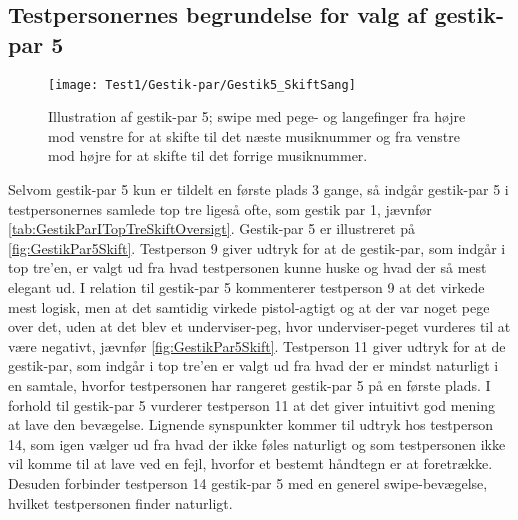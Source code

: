 \subsection{Testpersonernes begrundelse for valg af gestik-par 5}
\label{TestresultaterValgAfGestikkerBegrundelseGP5Skift}
%
%
\begin{figure}[H]
	\centering
	\texttt{[image: Test1/Gestik-par/Gestik5\_SkiftSang]}
	\caption{Illustration af gestik-par 5; swipe med pege- og langefinger fra højre mod venstre for at skifte til det næste musiknummer og fra venstre mod højre for at skifte til det forrige musiknummer.}
	\label{fig:GestikPar5Skift}
\end{figure}
\noindent
%
Selvom gestik-par 5 kun er tildelt en første plads 3 gange, så indgår gestik-par 5 i testpersonernes samlede top tre ligeså ofte, som gestik par 1, jævnfør \autoref{tab:GestikParITopTreSkiftOversigt}. Gestik-par 5 er illustreret på \autoref{fig:GestikPar5Skift}. Testperson 9 giver udtryk for at de gestik-par, som indgår i top tre'en, er valgt ud fra hvad testpersonen kunne huske og hvad der så mest elegant ud. I relation til gestik-par 5 kommenterer testperson 9 at det virkede mest logisk, men at det samtidig virkede pistol-agtigt og at der var noget pege over det, uden at det blev et underviser-peg, hvor underviser-peget vurderes til at være negativt, jævnfør \autoref{fig:GestikPar5Skift}. Testperson 11 giver udtryk for at de gestik-par, som indgår i top tre'en er valgt ud fra hvad der er mindst naturligt i en samtale, hvorfor testpersonen har rangeret gestik-par 5 på en første plads. I forhold til gestik-par 5 vurderer testperson 11 at det giver intuitivt god mening at lave den bevægelse. Lignende synspunkter kommer til udtryk hos testperson 14, som igen vælger ud fra hvad der ikke føles naturligt og som testpersonen ikke vil komme til at lave ved en fejl, hvorfor et bestemt håndtegn er at foretrække. Desuden forbinder testperson 14 gestik-par 5 med en generel swipe-bevægelse, hvilket testpersonen finder naturligt. 

